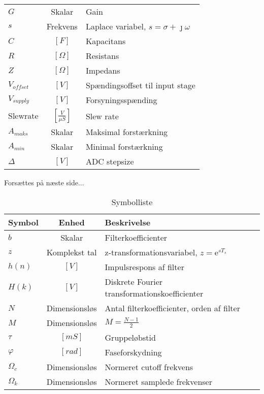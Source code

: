 \begin{table}[ht!]
\begin{threeparttable}
\begin{tabular}{l c p{}}
			$G$ & Skalar & Gain \\
			$s$ & Frekvens & Laplace variabel, $s = \sigma + \jmath \omega$ \\
			$C$ & $\left[\si{F}\right]$ & Kapacitans\\
			$R$ & $\left[\si{\Omega}\right]$ & Resistans\\
			$Z$ & $\left[\si{\Omega}\right]$ & Impedans\\
			$V_{offset}$ & $\left[\si{V}\right]$ & Spændingsoffset til input stage \\
			$V_{supply}$ & $\left[\si{V}\right]$ & Forsyningsspænding \\
			$\mathrm{Slew rate}$ & $\left[\si{\frac{V}{\mu S}}\right]$ & Slew rate \\
			$A_{maks}$ & Skalar & Maksimal forstærkning \\
			$A_{min}$ & Skalar & Minimal forstærkning\\
			$\Delta$ & $\left[\si{V}\right]$ & ADC stepsize\\
			
		
		\end{tabular}
	\begin{tablenotes}
		\item[] Forsættes på næste side...
	\end{tablenotes}
	\end{threeparttable}
\end{table}

\begin{table}[ht!]
	\caption{Symbolliste}
	\label{tab:symbolliste2}
	\begin{threeparttable}
		\begin{tabular}{l c p{}}
			\toprule
			\textbf{Symbol}      &
			\textbf{Enhed} & \textbf{Beskrivelse} \\
			\midrule
				$b$ & Skalar & Filterkoefficienter \\
			$z$ & Komplekst tal & z-transformationsvariabel, $z = \mathrm{e}^{sT_s}$\\
			$h(n)$ & $\left[\si{V}\right]$ & Impulsrespons af filter \\
			$H(k)$ & $\left[\si{V}\right]$ & Diskrete Fourier transformationskoefficienter\\
			$N$ & Dimensionsløs & Antal filterkoefficienter, orden af filter\\
			$M$ & Dimensionsløs & $M = \frac{N - 1}{2}$\\
			$\tau$ & $\left[\si{mS}\right]$ & Gruppeløbstid\\
			$\varphi$ & $\left[\si{rad}\right]$ & Faseforskydning\\
			$\Omega_c$ & Dimensionsløs & Normeret cutoff frekvens\\
			$\Omega_k$ & Dimensionsløs & Normeret samplede frekvenser\\		
			
		\end{tabular}
	\end{threeparttable}
\end{table}
